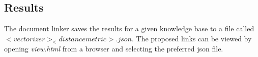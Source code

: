 \subsection{Results}
The document linker saves the results for a given knowledge base to a file called $<vectorizer>_<distance metric>.json$. The proposed links can be viewed by opening \emph{view.html} from a browser and selecting the preferred json file.  %
